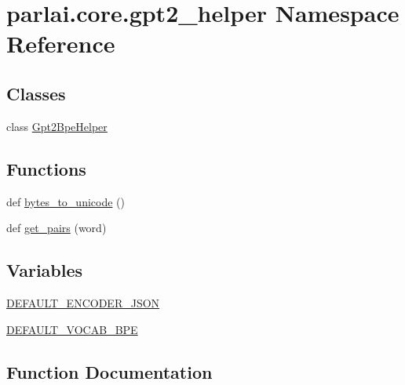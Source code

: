 \hypertarget{namespaceparlai_1_1core_1_1gpt2__helper}{}\section{parlai.\+core.\+gpt2\+\_\+helper Namespace Reference}
\label{namespaceparlai_1_1core_1_1gpt2__helper}
\subsection*{Classes}
\begin{DoxyCompactItemize}
\item 
class \hyperlink{classparlai_1_1core_1_1gpt2__helper_1_1Gpt2BpeHelper}{Gpt2\+Bpe\+Helper}
\end{DoxyCompactItemize}
\subsection*{Functions}
\begin{DoxyCompactItemize}
\item 
def \hyperlink{namespaceparlai_1_1core_1_1gpt2__helper_ae992d8ce81708900b1b1bb81bc7a816d}{bytes\+\_\+to\+\_\+unicode} ()
\item 
def \hyperlink{namespaceparlai_1_1core_1_1gpt2__helper_ac5bffa2aece99e43444185ba85dff425}{get\+\_\+pairs} (word)
\end{DoxyCompactItemize}
\subsection*{Variables}
\begin{DoxyCompactItemize}
\item 
\hyperlink{namespaceparlai_1_1core_1_1gpt2__helper_a39eb998ed915bcd1c86bafac1953a409}{D\+E\+F\+A\+U\+L\+T\+\_\+\+E\+N\+C\+O\+D\+E\+R\+\_\+\+J\+S\+ON}
\item 
\hyperlink{namespaceparlai_1_1core_1_1gpt2__helper_a7a40e1f5234a69039bc1a9765a50e048}{D\+E\+F\+A\+U\+L\+T\+\_\+\+V\+O\+C\+A\+B\+\_\+\+B\+PE}
\end{DoxyCompactItemize}


\subsection{Function Documentation}
\mbox{\label{namespaceparlai_1_1core_1_1gpt2__helper_ae992d8ce81708900b1b1bb81bc7a816d}} 
